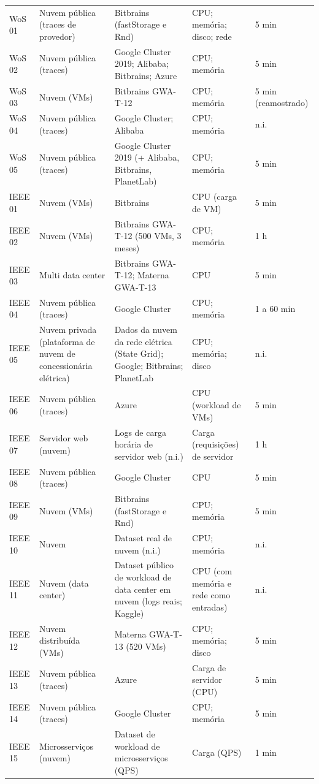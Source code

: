 {\begin{longtable}{p{1.3cm}p{3.2cm}p{5.0cm}p{3.5cm}p{1.8cm}}
WoS 01 & Nuvem pública (traces de provedor) & Bitbrains (fastStorage e Rnd) & CPU; memória; disco; rede & 5 min \\
WoS 02 & Nuvem pública (traces) & Google Cluster 2019; Alibaba; Bitbrains; Azure & CPU; memória & 5 min \\
WoS 03 & Nuvem (VMs) & Bitbrains GWA-T-12 & CPU; memória & 5 min (reamostrado) \\
WoS 04 & Nuvem pública (traces) & Google Cluster; Alibaba & CPU; memória & n.i. \\
WoS 05 & Nuvem pública (traces) & Google Cluster 2019 (+ Alibaba, Bitbrains, PlanetLab) & CPU; memória & 5 min \\
IEEE 01 & Nuvem (VMs) & Bitbrains & CPU (carga de VM) & 5 min \\
IEEE 02 & Nuvem (VMs) & Bitbrains GWA-T-12 (500 VMs, 3 meses) & CPU; memória & 1 h \\
IEEE 03 & Multi data center & Bitbrains GWA-T-12; Materna GWA-T-13 & CPU & 5 min \\
IEEE 04 & Nuvem pública (traces) & Google Cluster & CPU; memória & 1 a 60 min \\
IEEE 05 & Nuvem privada (plataforma de nuvem de concessionária elétrica) & Dados da nuvem da rede elétrica (State Grid); Google; Bitbrains; PlanetLab & CPU; memória; disco & n.i. \\
IEEE 06 & Nuvem pública (traces) & Azure & CPU (workload de VMs) & 5 min \\
IEEE 07 & Servidor web (nuvem) & Logs de carga horária de servidor web (n.i.) & Carga (requisições) de servidor & 1 h \\
IEEE 08 & Nuvem pública (traces) & Google Cluster & CPU & 5 min \\
IEEE 09 & Nuvem (VMs) & Bitbrains (fastStorage e Rnd) & CPU; memória & 5 min \\
IEEE 10 & Nuvem & Dataset real de nuvem (n.i.) & CPU; memória & n.i. \\
IEEE 11 & Nuvem (data center) & Dataset público de workload de data center em nuvem (logs reais; Kaggle) & CPU (com memória e rede como entradas) & n.i. \\
IEEE 12 & Nuvem distribuída (VMs) & Materna GWA-T-13 (520 VMs) & CPU; memória; disco & 5 min \\
IEEE 13 & Nuvem pública (traces) & Azure & Carga de servidor (CPU) & 5 min \\
IEEE 14 & Nuvem pública (traces) & Google Cluster & CPU; memória & 5 min \\
IEEE 15 & Microsserviços (nuvem) & Dataset de workload de microsserviços (QPS) & Carga (QPS) & 1 min \\

\end{longtable}}
